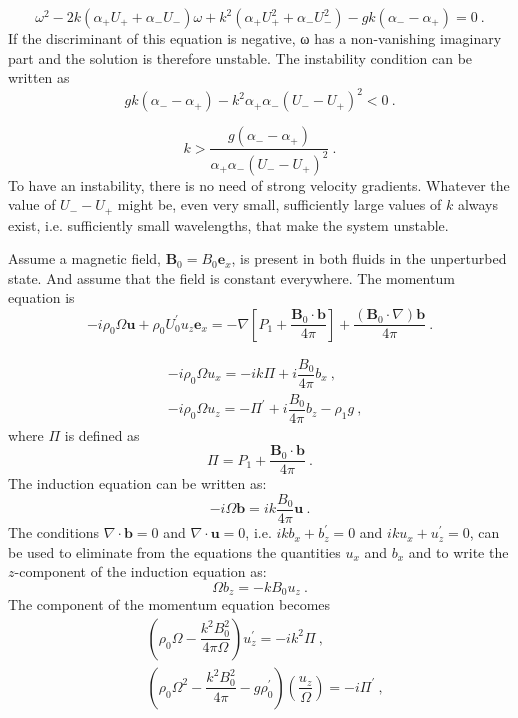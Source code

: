 \documentclass[12pt,a4paper]{article}
\renewcommand{\vec}[1]{\boldsymbol{#1}}
\begin{document}
\begin{equation}
\omega^2 -2k(\alpha_+ U_+ +\alpha_- U_-) \omega +k^2 (\alpha_+ U^2_+ + \alpha_- U^2_-) - gk(\alpha_- -\alpha_+) = 0 ~.
\end{equation}
If the discriminant of this equation is negative, ω has a non-vanishing imaginary part and the solution is therefore unstable. The instability condition can be written as
\begin{equation*}
gk(\alpha_- -\alpha_+) -k^2 \alpha_+ \alpha_-(U_- -U_+)^2 < 0 ~.
\end{equation*}

\begin{equation*}
k > \dfrac{g(\alpha_- -\alpha_+)}{\alpha_+ \alpha_-(U_- -U_+)^2} ~.
\end{equation*}
To have an instability, there is no need of strong velocity gradients. Whatever the value of $U_- - U_+$ might be, even very small, sufficiently large values of $k$ always exist, i.e. sufficiently small wavelengths, that make the system unstable.


Assume a magnetic field, $\vec{B}_0 = B_0 \vec{e}_x$, is present in both fluids in the unperturbed state. And assume that the field is constant everywhere. The momentum equation is
\begin{equation*}
-i \rho_0 \Omega \vec{u} +\rho_0 U_0^\prime u_z \vec{e}_x = -\nabla \left[P_1 +\dfrac{\vec{B}_0\cdot \vec{b}}{4\pi} \right] +\dfrac{(\vec{B}_0\cdot \nabla) \vec{b}}{4\pi} ~.
\end{equation*}

\begin{align*}
& -i \rho_0 \Omega u_x = -ik \Pi +i\dfrac{B_0}{4\pi} b_x ~, \\
& -i \rho_0 \Omega u_z = -\Pi^\prime +i\dfrac{B_0}{4\pi} b_z -\rho_1 g ~,
\end{align*}
where $\Pi$ is defined as
\begin{equation*}
\Pi = P_1 +\dfrac{\vec{B}_0\cdot \vec{b}}{4\pi} ~.
\end{equation*}
The induction equation can be written as:
\begin{equation*}
-i \Omega \vec{b} = ik \dfrac{B_0}{4\pi} \vec{u} ~.
\end{equation*}
The conditions $\nabla \cdot \vec{b} = 0$ and $\nabla \cdot \vec{u} = 0$, i.e. $ikb_x +b_z^\prime = 0$ and $iku_x +u_z^\prime = 0$, can be used to eliminate from the equations the quantities $u_x$ and $b_x$ and to write the $z$-component of the induction equation as:
\begin{equation}
\Omega b_z = -k B_0 u_z ~.
\end{equation}
The component of the momentum equation becomes
\begin{align}
& \left(\rho_0 \Omega -\dfrac{k^2 B_0^2}{4\pi \Omega} \right) u_z^\prime = -i k^2 \Pi ~, \\
& \left(\rho_0 \Omega^2 -\dfrac{k^2 B_0^2}{4\pi} -g \rho_0^\prime \right) \left(\dfrac{u_z}{\Omega} \right) = -i \Pi^\prime ~,
\end{align}
\end{document}
